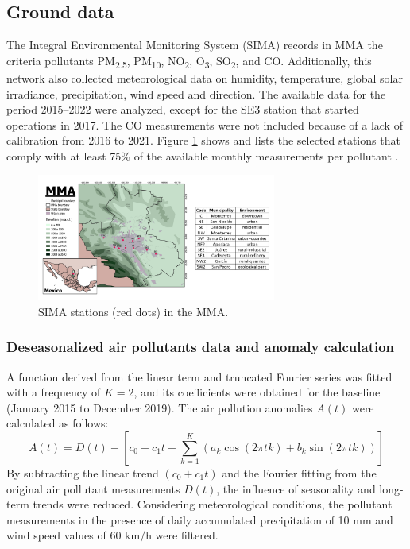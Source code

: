 \documentclass[preprint,12pt]{elsarticle}
\begin{document}
\subsection*{Ground data}
The Integral Environmental Monitoring System (SIMA) records in MMA the criteria pollutants PM\textsubscript{2.5}, PM\textsubscript{10}, NO\textsubscript{2}, O\textsubscript{3}, SO\textsubscript{2}, and CO. Additionally, this network also collected meteorological data on humidity, temperature, global solar irradiance, precipitation, wind speed and direction. The available data for the period 2015--2022 were analyzed, except for the SE3 station that started operations in 2017. The CO measurements were not included because of a lack of calibration from 2016 to 2021. Figure \ref{596247} shows and lists the selected stations that comply with at least 75\% of the available monthly measurements per pollutant \citep{mtodos}. 
\begin{figure}[H]
    \begin{center}
        \includegraphics[width=0.70\textwidth]{figures/amm_tabla.png}
        \caption{SIMA stations (red dots) in the MMA.
        {\label{596247}}}
    \end{center}
\end{figure}
\subsubsection*{Deseasonalized air pollutants data and anomaly calculation}
A function derived from the linear term and truncated Fourier series was fitted with a frequency of \(K=2\), and its coefficients were obtained \citep{Hernández-Paniagua2021} for the baseline (January 2015 to December 2019). The air pollution anomalies \(A\left(t\right)\) were calculated as follows:
\begin{equation}
    A\left(t\right)=D\left(t\right)-\left[c_0+c_1t+ \sum_{k=1}^{K}\left(a_{k}\cos(2\pi tk)+b_{k}\sin(2\pi tk)\right)\right]
    \label{eq:anomalies}
\end{equation}
By subtracting the linear trend \((c_{0}+c_{1}t)\) and the Fourier fitting from the original air pollutant measurements \(D(t)\), the influence of seasonality and long-term trends were reduced. Considering meteorological conditions, the pollutant measurements in the presence of daily accumulated precipitation of 10 mm and wind speed values of 60 km/h were filtered.
\end{document}

